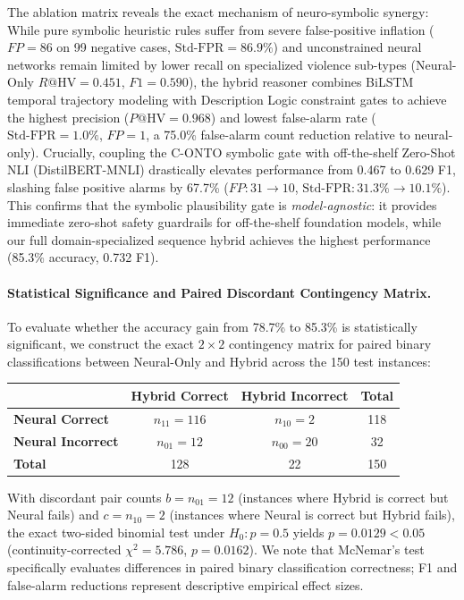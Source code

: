 \documentclass[11pt,a4paper]{article}
\begin{document}
\noindent
The ablation matrix reveals the exact mechanism of neuro-symbolic synergy:
While pure symbolic heuristic rules suffer from severe false-positive inflation ($FP=86$ on 99 negative cases, $\text{Std-FPR} = 86.9\%$) and unconstrained neural networks remain limited by lower recall on specialized violence sub-types (Neural-Only $R@\text{HV} = 0.451$, $F1 = 0.590$),
the hybrid reasoner combines BiLSTM temporal trajectory modeling with Description Logic constraint gates to achieve the highest precision ($P@\text{HV} = 0.968$) and lowest false-alarm rate ($\text{Std-FPR} = 1.0\%$, $FP=1$, a 75.0\% false-alarm count reduction relative to neural-only).
Crucially, coupling the C-ONTO symbolic gate with off-the-shelf Zero-Shot NLI (DistilBERT-MNLI) drastically elevates performance from 0.467 to 0.629 F1, slashing false positive alarms by 67.7\% ($FP: 31 \to 10$, $\text{Std-FPR}: 31.3\% \to 10.1\%$).
This confirms that the symbolic plausibility gate is \textit{model-agnostic}: it provides immediate zero-shot safety guardrails for off-the-shelf foundation models, while our full domain-specialized sequence hybrid achieves the highest performance (85.3\% accuracy, 0.732 F1).

\paragraph{Statistical Significance and Paired Discordant Contingency Matrix.}
To evaluate whether the accuracy gain from 78.7\% to 85.3\% is statistically significant, we construct the exact $2 \times 2$ contingency matrix for paired binary classifications between Neural-Only and Hybrid across the 150 test instances:
\begin{center}
\small
\begin{tabular}{l|cc|c}
\toprule
& \textbf{Hybrid Correct} & \textbf{Hybrid Incorrect} & \textbf{Total} \\
\midrule
\textbf{Neural Correct}   & $n_{11} = 116$ & $n_{10} = 2$  & 118 \\
\textbf{Neural Incorrect} & $n_{01} = 12$  & $n_{00} = 20$ & 32  \\
\midrule
\textbf{Total}            & 128            & 22            & 150 \\
\bottomrule
\end{tabular}
\end{center}
With discordant pair counts $b = n_{01} = 12$ (instances where Hybrid is correct but Neural fails) and $c = n_{10} = 2$ (instances where Neural is correct but Hybrid fails), the exact two-sided binomial test under $H_0: p=0.5$ \citep{mcnemar1947} yields $p = 0.0129 < 0.05$ (continuity-corrected $\chi^2 = 5.786$, $p = 0.0162$). We note that McNemar's test specifically evaluates differences in paired binary classification correctness; F1 and false-alarm reductions represent descriptive empirical effect sizes.
\end{document}
